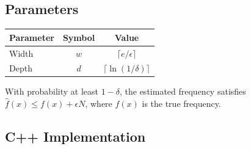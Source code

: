 \subsection{Parameters}

\begin{center}
\begin{tabular}{lcc}
\toprule
Parameter & Symbol & Value \\
\midrule
Width & $w$ & $\lceil e / \epsilon \rceil$ \\
Depth & $d$ & $\lceil \ln(1/\delta) \rceil$ \\
\bottomrule
\end{tabular}
\end{center}

With probability at least $1 - \delta$, the estimated frequency satisfies $\hat{f}(x) \leq f(x) + \epsilon N$, where $f(x)$ is the true frequency.

\subsection{C++ Implementation}

